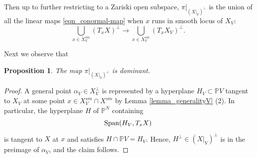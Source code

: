 \documentclass[12pt]{amsart}
\newtheorem{proposition}[theorem]{Proposition}
\begin{document}


Then up to further restricting to a Zariski open subspace, $\pi|_{(X|_V)^{\perp}}$ is the union of all the linear maps \eqref{eqn_conormal-map} when $x$ runs in smooth locus of $X_V$:
\begin{equation}\label{eqn_union}
    \bigcup_{x\in X_V^{sm}}(T_xX)^{\perp}\to \bigcup_{x\in X_V^{sm}}(T_xX_V)^{\perp}.
\end{equation}

Next we observe that
\begin{proposition}\label{prop_critical-dom}
  The map  $\pi|_{(X|_V)^{\perp}}$  is dominant.
\end{proposition}
\begin{proof}
A general point $\alpha_V\in X_V^\perp$ is represented by a hyperplane
$H_V\subset \mathbb PV$ tangent to $X_V$ at some point
$x\in X_V^{sm}\cap X^{sm}$ by Lemma \ref{lemma_generalityV} (2). In particular, the hyperplane $H$ of $\mathbb{P}^N$ containing 
\begin{equation}\label{eqn_section}
   \textup{Span}(H_V,T_xX)
\end{equation} is tangent to $X$ at $x$ and satisfies $H\cap \mathbb PV=H_V$. Hence, $H^{\perp}\in (X|_V)^{\perp}$ is in the preimage of $\alpha_V$, and the claim follows.
\end{proof}


\end{document}
